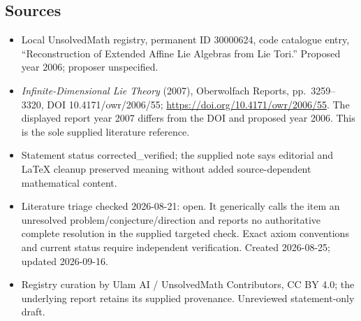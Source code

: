 \documentclass[11pt]{article}
\begin{document}
\subsection{Sources}
\begin{itemize}
\item Local UnsolvedMath registry, permanent ID 30000624, code catalogue entry, ``Reconstruction of Extended Affine Lie Algebras from Lie Tori.'' Proposed year 2006; proposer unspecified.
\item \emph{Infinite-Dimensional Lie Theory} (2007), Oberwolfach Reports, pp.\ 3259--3320, DOI 10.4171/owr/2006/55; \url{https://doi.org/10.4171/owr/2006/55}. The displayed report year 2007 differs from the DOI and proposed year 2006. This is the sole supplied literature reference.
\item Statement status corrected\_verified; the supplied note says editorial and LaTeX cleanup preserved meaning without added source-dependent mathematical content.
\item Literature triage checked 2026-08-21: open. It generically calls the item an unresolved problem/conjecture/direction and reports no authoritative complete resolution in the supplied targeted check. Exact axiom conventions and current status require independent verification. Created 2026-08-25; updated 2026-09-16.
\item Registry curation by Ulam AI / UnsolvedMath Contributors, CC BY 4.0; the underlying report retains its supplied provenance. Unreviewed statement-only draft.
\end{itemize}
\end{document}
